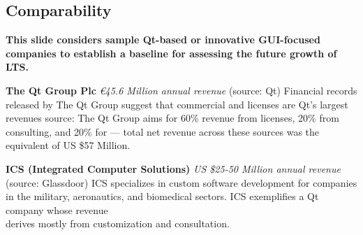 
\begin{frame}{}
\section{Comparability}
\vspace{.5em}	

{\Large%
\hspace*{-2pt}\begin{minipage}{\textwidth}
\vspace{-11pt}


		


{\hspace{1.5em}\begin{minipage}[l]{.9\textwidth}\Large\centering\color{slidePartHeadColor} 	
{\LARGE \textbf{This slide considers sample Qt-based 
or innovative GUI-focused companies to establish a baseline for assessing 
	the future growth of LTS.}}
\vspace{.7em}	
\end{minipage}}
\vspace{.8em}

{\fontsize{18}{16}\selectfont \setlength{\leftmargini}{30pt}\begin{enumerate}
\dmitem \textbf{The Qt Group Plc} 
\textit{\euro{}45.6 Million annual revenue} (source: Qt)
Financial records \\released by The Qt Group suggest that commercial 
 and  licenses 
are Qt's largest revenues source: The Qt Group 
aims for 60\% revenue from licenses, 20\% from 
consulting, and 20\% for  
--- total net revenue across these sources was 
the equivalent of US \$57 Million.\vspace{20pt}

\dmitem \textbf{ICS (Integrated Computer Solutions)} 
\textit{US \$25-50 Million annual revenue} (source: Glassdoor)
ICS specializes in custom software development 
for companies in the military, aeronautics, and 
biomedical sectors.  ICS exemplifies a 
Qt company whose revenue \\derives mostly from 
customization and consultation.\vspace{20pt}


\end{enumerate}}
\end{minipage}}
\end{frame}
